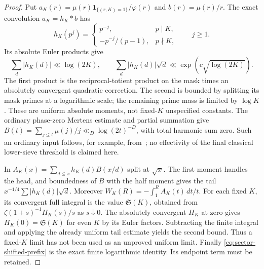 \documentclass[11pt,a4paper]{article}
\theoremstyle{definition}
\theoremstyle{remark}
\begin{document}
\begin{proof}
Put $a_K(r)=\mu(r)\mathbf1_{\{(r,K)=1\}}/\varphi(r)$ and
$b(r)=\mu(r)/r$.  The exact convolution $a_K=h_K*b$ has
\[
 h_K(p^j)=
 \begin{cases}p^{-j},&p\mid K,\\
              -p^{-j}/(p-1),&p\nmid K,
 \end{cases}\qquad j\geq1.
\]
Its absolute Euler products give
\[
 \sum_d|h_K(d)|\ll\log(2K),\qquad
 \sum_d|h_K(d)|\sqrt d\ll\exp(c\sqrt{\log(2K)}).
\]
The first product is the reciprocal-totient product on the mask
times an absolutely convergent quadratic correction.  The second
is bounded by splitting its mask primes at a logarithmic scale;
the remaining prime mass is limited by $\log K$.  These are
uniform absolute moments, not fixed-$K$ unspecified constants.
The ordinary phase-zero Mertens estimate and partial summation give
$B(t)=\sum_{j\leq t}\mu(j)/j\ll_D\log(2t)^{-D}$, with total
harmonic sum zero.  Such an ordinary input follows, for example,
from~\cite{LL}; no effectivity of the final classical lower-sieve
threshold is claimed here.

In $A_K(x)=\sum_{d\leq x}h_K(d)B(x/d)$ split at $\sqrt x$.
The first moment handles the head, and boundedness of $B$ with
the half moment gives the tail $x^{-1/4}\sum|h_K(d)|\sqrt d$.
Moreover
$W_K(R)=-\int_1^RA_K(t)\,dt/t$.
For each fixed $K$, its convergent full integral is the value
$\mathfrak S(K)$, obtained from
$\zeta(1+s)^{-1}H_K(s)/s$ as $s\downarrow0$.
The absolutely convergent $H_K$ at zero gives
$H_K(0)=\mathfrak S(K)$ for even $K$ by its Euler factors.
Subtracting the finite integral and applying the already uniform
tail estimate yields the second bound.  Thus a fixed-$K$ limit
has not been used as an unproved uniform limit.  Finally
\eqref{eq:sector-shifted-prefix} is the exact finite logarithmic
identity.  Its endpoint term must be retained.
\end{proof}
\end{document}
